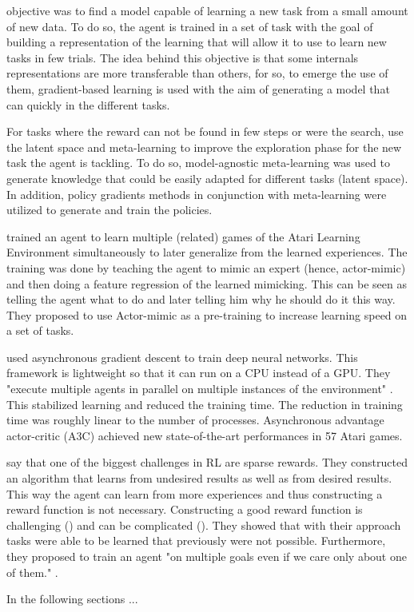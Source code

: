\cite{MAML} objective was to find a model capable of learning a new task from a small amount of new data. To do so, the agent is trained in a set of task with the goal of building a representation of the learning that will allow it to use to learn new tasks in few trials. The idea behind this objective is that some internals representations are more transferable than others, for so, to emerge the use of them, gradient-based learning is used with the aim of generating a model that can quickly in the different tasks.

For tasks where the reward can not be found in few steps or were the search, \citet{MAESN} use the latent space and meta-learning to improve the exploration phase for the new task the agent is tackling. To do so, model-agnostic meta-learning was used to generate knowledge that could be easily adapted for different tasks (latent space). In addition, policy gradients methods in conjunction with meta-learning were utilized to generate and train the policies. 

\citet{parisotto2015actor} trained an agent to learn multiple (related) games of the Atari Learning Environment simultaneously to later generalize from the learned experiences. The training was done by teaching the agent to mimic an expert (hence, actor-mimic) and then doing a feature regression of the learned mimicking. This can be seen as telling the agent what to do and later telling him why he should do it this way. They proposed to use Actor-mimic as a pre-training to increase learning speed on a set of tasks.

\citet{mnih2016asynchronous} used asynchronous gradient descent to train deep neural networks. This framework is lightweight so that it can run on a CPU instead of a GPU. They "execute multiple agents in parallel on multiple instances of the environment" \citet{mnih2016asynchronous}. This stabilized learning and reduced the training time. The reduction in training time was roughly linear to the number of processes. Asynchronous advantage actor-critic (A3C) achieved new state-of-the-art performances in 57 Atari games.

\citet{andrychowicz2017hindsight} say that one of the biggest challenges in RL are sparse rewards. They constructed an algorithm that learns from undesired results as well as from desired results. This way the agent can learn from more experiences and thus constructing a reward function is not necessary. Constructing a good reward function is challenging (\cite{ng1999policy}) and can be complicated (\cite{popov2017data}). They showed that with their approach tasks were able to be learned that previously were not possible. Furthermore, they proposed to train an agent "on multiple goals even if we care only about one of them." \citet{andrychowicz2017hindsight}.

In the following sections ...
